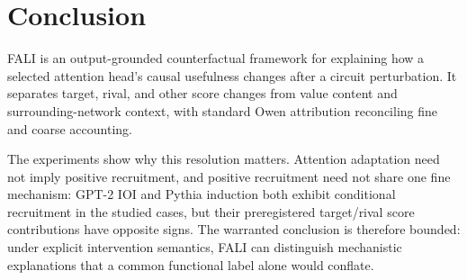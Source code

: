 \section{Conclusion}\label{sec:conclusion}

FALI is an output-grounded counterfactual framework for explaining how a selected attention head's causal usefulness changes after a circuit perturbation. It separates target, rival, and other score changes from value content and surrounding-network context, with standard Owen attribution reconciling fine and coarse accounting.

The experiments show why this resolution matters. Attention adaptation need not imply positive recruitment, and positive recruitment need not share one fine mechanism: GPT-2 IOI and Pythia induction both exhibit conditional recruitment in the studied cases, but their preregistered target/rival score contributions have opposite signs. The warranted conclusion is therefore bounded: under explicit intervention semantics, FALI can distinguish mechanistic explanations that a common functional label alone would conflate.
